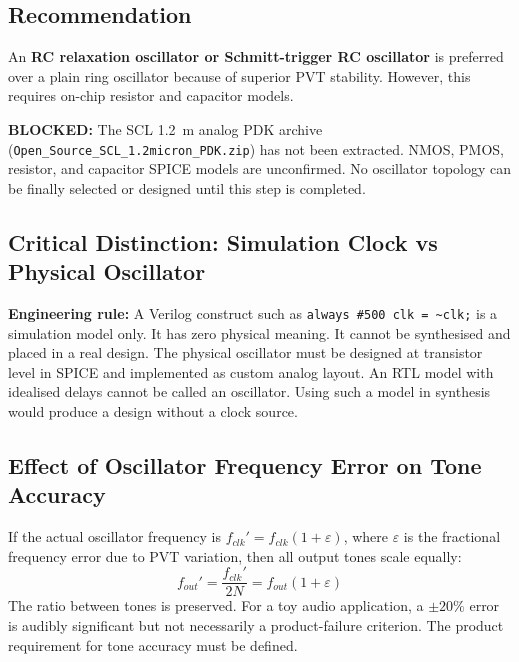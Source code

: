 \documentclass[11pt,a4paper]{article}
\begin{document}
\subsection{Recommendation}

An \textbf{RC relaxation oscillator or Schmitt-trigger RC oscillator} is preferred over a
plain ring oscillator because of superior PVT stability. However, this requires on-chip resistor
and capacitor models.

\begin{mdframed}[backgroundcolor=unknown!10,linecolor=unknown]
  \textbf{BLOCKED:} The SCL 1.2~\textmu m analog PDK archive (\texttt{Open\_Source\_SCL\_1.2micron\_PDK.zip})
  has not been extracted. NMOS, PMOS, resistor, and capacitor SPICE models are unconfirmed.
  No oscillator topology can be finally selected or designed until this step is completed.
\end{mdframed}

\subsection{Critical Distinction: Simulation Clock vs Physical Oscillator}

\begin{mdframed}[backgroundcolor=riskred!10,linecolor=riskred]
  \textbf{Engineering rule:} A Verilog construct such as \texttt{always \#500 clk = \~{}clk;}
  is a simulation model only. It has zero physical meaning. It cannot be synthesised and placed
  in a real design. The physical oscillator must be designed at transistor level in SPICE and
  implemented as custom analog layout. An RTL model with idealised delays cannot be called an
  oscillator. Using such a model in synthesis would produce a design without a clock source.
\end{mdframed}

\subsection{Effect of Oscillator Frequency Error on Tone Accuracy}

If the actual oscillator frequency is $f_{clk}' = f_{clk}(1+\varepsilon)$, where $\varepsilon$
is the fractional frequency error due to PVT variation, then all output tones scale equally:
\begin{equation}
  f_{out}' = \frac{f_{clk}'}{2N} = f_{out}(1+\varepsilon)
\end{equation}
The ratio between tones is preserved. For a toy audio application, a $\pm20\%$ error is audibly
significant but not necessarily a product-failure criterion. The product requirement for tone
accuracy must be defined.
\end{document}
